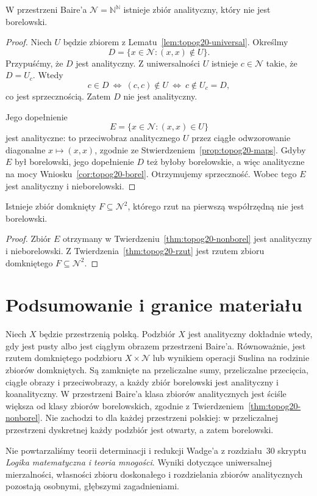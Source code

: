 \begin{twierdzenie}
\label{thm:topog20-nonborel}
W przestrzeni Baire'a
\(\mathcal N=\mathbb N^{\mathbb N}\)
istnieje zbiór analityczny,
który nie jest borelowski.
\end{twierdzenie}
\begin{proof}
Niech \(U\) będzie zbiorem
z Lematu~\ref{lem:topog20-universal}.
Określmy
\[
 D=\{x\in\mathcal N:
                 (x,x)\notin U\}.
\]
Przypuśćmy, że \(D\)
jest analityczny.
Z uniwersalności \(U\)
istnieje \(c\in\mathcal N\)
takie, że \(D=U_c\).
Wtedy
\[
 c\in D
 \ \Longleftrightarrow\ (c,c)\notin U
 \ \Longleftrightarrow\ c\notin U_c=D,
\]
co jest sprzecznością.
Zatem \(D\) nie jest analityczny.

Jego dopełnienie
\[
 E=\{x\in\mathcal N:(x,x)\in U\}
\]
jest analityczne:
to przeciwobraz analitycznego
\(U\) przez ciągłe
odwzorowanie diagonalne
\(x\mapsto(x,x)\), zgodnie ze
Stwierdzeniem~\ref{prop:topog20-maps}.
Gdyby \(E\) był borelowski,
jego dopełnienie \(D\)
też byłoby borelowskie,
a więc analityczne na mocy
Wniosku~\ref{cor:topog20-borel}.
Otrzymujemy sprzeczność.
Wobec tego \(E\) jest
analityczny i nieborelowski.
\end{proof}

\begin{wniosek}
\label{cor:topog20-projection}
Istnieje zbiór domknięty
\(F\subseteq\mathcal N^2\),
którego rzut na pierwszą
współrzędną nie jest borelowski.
\end{wniosek}
\begin{proof}
Zbiór \(E\) otrzymany w
Twierdzeniu~\ref{thm:topog20-nonborel}
jest analityczny i nieborelowski.
Z Twierdzenia~\ref{thm:topog20-rzut}
jest rzutem zbioru domkniętego
\(F\subseteq\mathcal N^2\).
\end{proof}

\section{Podsumowanie i granice materiału}
\label{sec:topog20-summary}

Niech \(X\) będzie przestrzenią polską.
Podzbiór \(X\) jest analityczny
dokładnie wtedy, gdy jest pusty
albo jest ciągłym obrazem
przestrzeni Baire'a.
Równoważnie, jest rzutem
domkniętego podzbioru
\(X\times\mathcal N\) lub wynikiem
operacji Suslina na rodzinie
zbiorów domkniętych.
Są zamknięte na przeliczalne
sumy, przeliczalne przecięcia,
ciągłe obrazy i przeciwobrazy,
a każdy zbiór borelowski
jest analityczny i koanalityczny.
W przestrzeni Baire'a
klasa zbiorów analitycznych
jest ściśle większa od klasy
zbiorów borelowskich, zgodnie z
Twierdzeniem~\ref{thm:topog20-nonborel}.
Nie zachodzi to dla każdej
przestrzeni polskiej:
w przeliczalnej przestrzeni
dyskretnej każdy podzbiór
jest otwarty, a zatem borelowski.

Nie powtarzaliśmy teorii
determinacji i redukcji Wadge'a
z rozdziału~30 skryptu
\emph{Logika matematyczna i teoria mnogości}.
Wyniki dotyczące
uniwersalnej mierzalności,
własności zbioru doskonałego
i rozdzielania zbiorów analitycznych
pozostają osobnymi,
głębszymi zagadnieniami.
